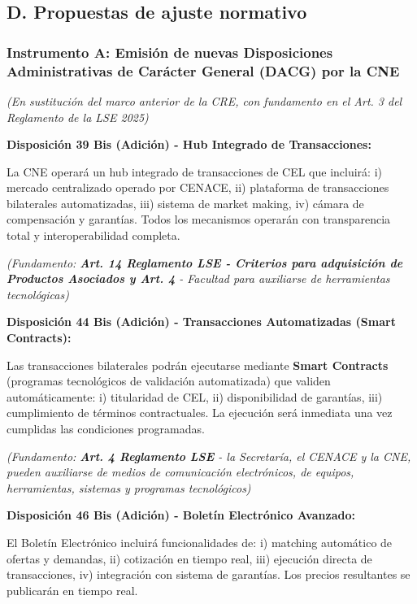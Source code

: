 \documentclass{cel}
\begin{document}
\subsection{D. Propuestas de ajuste normativo}
\nopagebreak

\subsubsection{Instrumento A: Emisión de nuevas Disposiciones Administrativas de Carácter General (DACG) por la CNE}
\nopagebreak

\textit{(En sustitución del marco anterior de la CRE, con fundamento en el Art. 3 del Reglamento de la LSE 2025)}


\textbf{Disposición 39 Bis (Adición) - Hub Integrado de Transacciones:}

\textquotedbl{}La CNE operará un hub integrado de transacciones de CEL que incluirá: i) mercado centralizado operado por CENACE, ii) plataforma de transacciones bilaterales automatizadas, iii) sistema de market making, iv) cámara de compensación y garantías. Todos los mecanismos operarán con transparencia total y interoperabilidad completa.\textquotedbl{}

\textit{(Fundamento: \textbf{Art. 14 Reglamento LSE \textbf{ - Criterios para adquisición de Productos Asociados y }Art. 4} - Facultad para auxiliarse de herramientas tecnológicas)}


\textbf{Disposición 44 Bis (Adición) - Transacciones Automatizadas (Smart Contracts):}

\textquotedbl{}Las transacciones bilaterales podrán ejecutarse mediante \textbf{Smart Contracts} (programas tecnológicos de validación automatizada) que validen automáticamente: i) titularidad de CEL, ii) disponibilidad de garantías, iii) cumplimiento de términos contractuales. La ejecución será inmediata una vez cumplidas las condiciones programadas.\textquotedbl{}

\textit{(Fundamento: \textbf{Art. 4 Reglamento LSE} - \textquotedbl{}la Secretaría, el CENACE y la CNE, pueden auxiliarse de medios de comunicación electrónicos, de equipos, herramientas, sistemas y programas tecnológicos\textquotedbl{})}


\textbf{Disposición 46 Bis (Adición) - Boletín Electrónico Avanzado:}

\textquotedbl{}El Boletín Electrónico incluirá funcionalidades de: i) matching automático de ofertas y demandas, ii) cotización en tiempo real, iii) ejecución directa de transacciones, iv) integración con sistema de garantías. Los precios resultantes se publicarán en tiempo real.\textquotedbl{}
\end{document}

